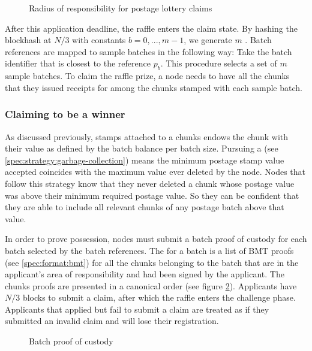 \begin{figure}[htbp]
  \centering
  \caption[Radius of responsibility for postage lottery claims]{Radius of responsibility for postage lottery claims}
  \label{fig:raffle-radius}
\end{figure}

After this application deadline, the raffle enters the claim state. By hashing the blockhash at $N/3$ with constants $b=0, ..., m-1$, we generate $m$ . Batch references are mapped to sample batches in the following way: Take the batch identifier that is closest to the reference $p_b$. This procedure selects a set of $m$ sample batches. To claim the raffle prize, a node needs to have all the chunks that they issued receipts for among the chunks stamped with each sample batch. 

\subsubsection{Claiming to be a winner}

As discussed previously, stamps attached to a  chunks endows the chunk with their value as defined by the batch balance per batch size. Pursuing a  (see \ref{spec:strategy:garbage-collection}) means the minimum postage stamp value accepted coincides with the maximum value ever deleted by the node. Nodes that follow this strategy know that they never deleted a chunk whose postage value was above their minimum required postage value. So they can be confident that they are able to include all relevant chunks of any postage batch above that value.

In order to prove possession, nodes must submit a batch proof of custody for each batch selected by the batch references. The  for a batch is a list of BMT proofs (see \ref{spec:format:bmt}) for all the chunks belonging to the batch that are in the applicant's area of responsibility and had been signed by the applicant. The chunks proofs are presented in a canonical order (see figure \ref{fig:batch-proof-of-custody}). Applicants have $N/3$ blocks to submit a claim, after which the raffle enters the challenge phase. Applicants that applied but fail to submit a claim are treated as if they submitted an invalid claim and will lose their registration.


\begin{figure}[htbp]
  \centering
  \caption{Batch proof of custody}
  \label{fig:batch-proof-of-custody}
\end{figure}

